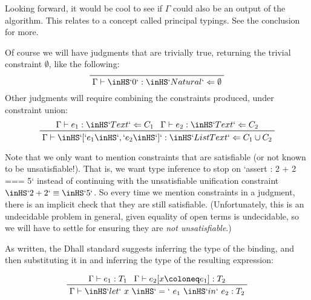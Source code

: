 \documentclass[11pt, twoside, reqno]{book}
\begin{document}
\bigskip
\begin{mdframed}[style=Note]
Looking forward, it would be cool to see if \(\Gamma\) could also be an output of the algorithm.
This relates to a concept called principal typings.
See the conclusion for more.
\end{mdframed}



Of course we will have judgments that are trivially true, returning the trivial constraint \(\emptyset\), like the following:
\begin{displaymath}
\prftree{\Gamma \vdash \inHS`0` : \inHS`Natural` \Leftarrow \emptyset}
\end{displaymath}
Other judgments will require combining the constraints produced, under constraint union:
\begin{displaymath}
\prftree{\Gamma \vdash e_1 : \inHS`Text` \Leftarrow C_1}{\Gamma \vdash e_2 : \inHS`Text` \Leftarrow C_2}{\Gamma \vdash \inHS`[`e_1\inHS`,` e_2\inHS`]` : \inHS`List Text` \Leftarrow C_1 \cup C_2}
\end{displaymath}

Note that we only want to mention constraints that are satisfiable (or not known to be unsatisfiable!).
That is, we want type inference to stop on \inHS`assert : 2 + 2 === 5` instead of continuing with the unsatisfiable unification constraint \(\inHS`2 + 2` \equiv \inHS`5`\).
So every time we mention constraints in a judgment, there is an implicit check that they are still satisfiable.
(Unfortunately, this is an undecidable problem in general, given equality of open terms is undecidable, so we will have to settle for ensuring they are \emph{not unsatisfiable}.)

As written, the Dhall standard suggests inferring the type of the binding, and then substituting it in and inferring the type of the resulting expression:

\begin{displaymath}
\prftree{\Gamma \vdash e_1 : T_1}{\Gamma \vdash e_2[x \coloneq e_1] : T_2}{\Gamma \vdash \inHS`let`\ x\ \inHS`=`\ e_1\ \inHS`in`\ e_2 : T_2}
\end{displaymath}
\end{document}
